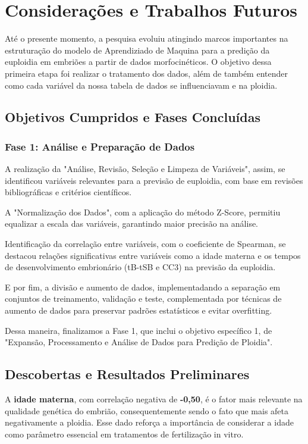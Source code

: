 \chapter[Considerações e Trabalhos Futuros]{Considerações e Trabalhos Futuros}

Até o presente momento, a pesquisa evoluiu atingindo marcos importantes na estruturação do modelo de Aprendiziado de Maquina para a predição da euploidia em embriões a partir de dados morfocinéticos. O objetivo dessa primeira etapa foi realizar o tratamento dos dados, além de também entender como cada variável da nossa tabela de dados se influenciavam e na ploidia. 

\section{Objetivos Cumpridos e Fases Concluídas}
\subsection{Fase 1: Análise e Preparação de Dados}
A realização da "Análise, Revisão, Seleção e Limpeza de Variáveis", assim, se identificou variáveis relevantes para a previsão de euploidia, com base em revisões bibliográficas e critérios científicos.

A "Normalização dos Dados", com a aplicação do método Z-Score, permitiu equalizar a escala das variáveis, garantindo maior precisão na análise.

Identificação da correlação entre variáveis, com o coeficiente de Spearman, se destacou relações significativas entre variáveis como a idade materna e os tempos de desenvolvimento embrionário (tB-tSB e CC3) na previsão da euploidia.

E por fim, a divisão e aumento de dados, implementadando a separação em conjuntos de treinamento, validação e teste, complementada por técnicas de aumento de dados para preservar padrões estatísticos e evitar overfitting.

Dessa maneira, finalizamos a Fase 1, que inclui o objetivo específico 1, de "Expansão, Processamento e Análise de Dados para Predição de Ploidia". 

\section{Descobertas e Resultados Preliminares}

A \textbf{idade materna}, com correlação negativa de \textbf{-0,50}, é o fator mais relevante na qualidade genética do embrião, consequentemente sendo o fato que mais afeta negativamente a ploidia. Esse dado reforça a importância de considerar a idade como parâmetro essencial em tratamentos de fertilização in vitro.

